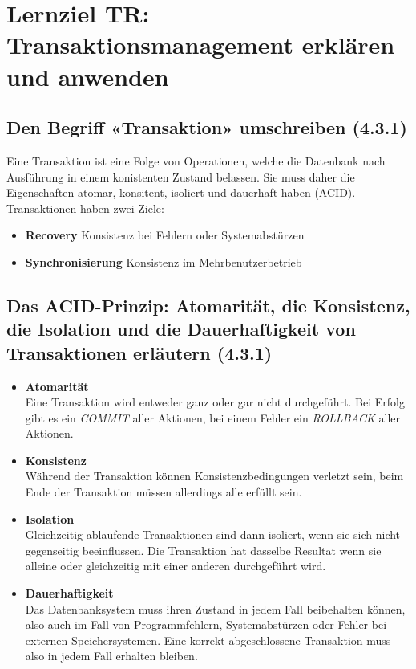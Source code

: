 \section{Lernziel TR: Transaktionsmanagement erklären und anwenden}

\subsection{Den Begriff «Transaktion» umschreiben (4.3.1)}
Eine Transaktion ist eine Folge von Operationen, welche die Datenbank nach Ausführung in einem konistenten Zustand belassen.
Sie muss daher die Eigenschaften atomar, konsitent, isoliert und dauerhaft haben (ACID).
Transaktionen haben zwei Ziele:

\begin{itemize}
  \item \textbf{Recovery}
  Konsistenz bei Fehlern oder Systemabstürzen
  \item \textbf{Synchronisierung}
  Konsistenz im Mehrbenutzerbetrieb
\end{itemize}

\subsection{Das ACID-Prinzip: Atomarität, die Konsistenz, die Isolation und die Dauerhaftigkeit von Transaktionen erläutern (4.3.1)}
\begin{itemize}
  \item \textbf{Atomarität} \\
  Eine Transaktion wird entweder ganz oder gar nicht durchgeführt. Bei Erfolg gibt es ein \emph{COMMIT} aller Aktionen, bei einem Fehler ein \emph{ROLLBACK} aller Aktionen.
  \item \textbf{Konsistenz} \\
  Während der Transaktion können Konsistenzbedingungen verletzt sein, beim Ende der Transaktion müssen allerdings alle erfüllt sein.
  \item \textbf{Isolation} \\
  Gleichzeitig ablaufende Transaktionen sind dann isoliert, wenn sie sich nicht gegenseitig beeinflussen. Die Transaktion hat dasselbe Resultat wenn sie alleine oder gleichzeitig mit einer anderen durchgeführt wird.
  \item \textbf{Dauerhaftigkeit} \\
  Das Datenbanksystem muss ihren Zustand in jedem Fall beibehalten können, also auch im Fall von Programmfehlern, Systemabstürzen oder Fehler bei externen Speichersystemen. Eine korrekt abgeschlossene Transaktion muss also in jedem Fall erhalten bleiben.
\end{itemize}

